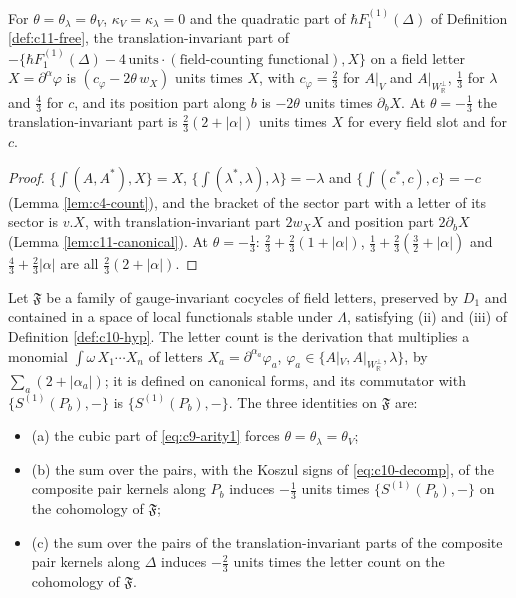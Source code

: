 \begin{lemma}
\label{lem:c11-onebody}
For $\theta=\theta_\lambda=\theta_V$, $\kappa_V=\kappa_\lambda=0$ and the quadratic part of $\hbar F_1^{(1)}(\Delta)$ of Definition \ref{def:c11-free}, the translation-invariant part of $-\big\{\hbar F_1^{(1)}(\Delta)-4\,\text{units}\cdot(\text{field-counting functional}),X\big\}$ on a field letter $X=\partial^\alpha\varphi$ is $(c_\varphi-2\theta\,w_X)$ units times $X$, with $c_\varphi=\tfrac23$ for $A|_V$ and $A|_{W_{\mathbb R}^\perp}$, $\tfrac13$ for $\lambda$ and $\tfrac43$ for $c$, and its position part along $b$ is $-2\theta$ units times $\partial_bX$. At $\theta=-\tfrac13$ the translation-invariant part is $\tfrac23(2+|\alpha|)$ units times $X$ for every field slot and for $c$.
\end{lemma}

\begin{proof}
$\{\int(A,A^*),X\}=X$, $\{\int(\lambda^*,\lambda),\lambda\}=-\lambda$ and $\{\int(c^*,c),c\}=-c$ (Lemma \ref{lem:c4-count}), and the bracket of the sector part with a letter of its sector is $v.X$, with translation-invariant part $2w_XX$ and position part $2\partial_bX$ (Lemma \ref{lem:c11-canonical}). At $\theta=-\tfrac13$: $\tfrac23+\tfrac23(1+|\alpha|)$, $\tfrac13+\tfrac23(\tfrac32+|\alpha|)$ and $\tfrac43+\tfrac23|\alpha|$ are all $\tfrac23(2+|\alpha|)$.
\end{proof}

\begin{definition}
\label{def:c11-P7}
Let $\mathfrak F$ be a family of gauge-invariant cocycles of field letters, preserved by $D_1$ and contained in a space of local functionals stable under $\Lambda$, satisfying (ii) and (iii) of Definition \ref{def:c10-hyp}. The letter count is the derivation that multiplies a monomial $\int\omega\,X_1\cdots X_n$ of letters $X_a=\partial^{\alpha_a}\varphi_a$, $\varphi_a\in\{A|_V,A|_{W_{\mathbb R}^\perp},\lambda\}$, by $\sum_a(2+|\alpha_a|)$; it is defined on canonical forms, and its commutator with $\{S^{(1)}(P_b),-\}$ is $\{S^{(1)}(P_b),-\}$. The three identities on $\mathfrak F$ are:
\begin{itemize}
\item (a) the cubic part of \eqref{eq:c9-arity1} forces $\theta=\theta_\lambda=\theta_V$;
\item (b) the sum over the pairs, with the Koszul signs of \eqref{eq:c10-decomp}, of the composite pair kernels along $P_b$ induces $-\tfrac13$ units times $\{S^{(1)}(P_b),-\}$ on the cohomology of $\mathfrak F$;
\item (c) the sum over the pairs of the translation-invariant parts of the composite pair kernels along $\Delta$ induces $-\tfrac23$ units times the letter count on the cohomology of $\mathfrak F$.
\end{itemize}
\end{definition}


